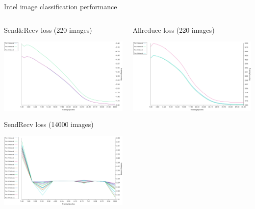 \documentclass[presentation]{beamer}
\begin{document}
\begin{frame}[label={sec:orged96df4}]{Intel image classification performance}
\begin{columns}
\begin{column}{0.55\columnwidth}
\begin{block}{Send\&Recv loss (220 images)}
\begin{center}
\includegraphics[width=.9\linewidth]{./png/intelImage_subset_sendrecving_loss.png}
\end{center}
 SendRecv loss (14000 images)
\begin{center}
\includegraphics[width=.9\linewidth]{./png/intelImage_sendrecv_loss.png}
\end{center}
\end{block}
\end{column}
\begin{column}{0.55\columnwidth}
\begin{block}{Allreduce loss (220 images)}
\begin{center}
\includegraphics[width=.9\linewidth]{./png/intelImage_subset_allreduce_loss.png}

\end{center}
\end{block}
\end{column}
\end{columns}
\end{frame}
\end{document}
